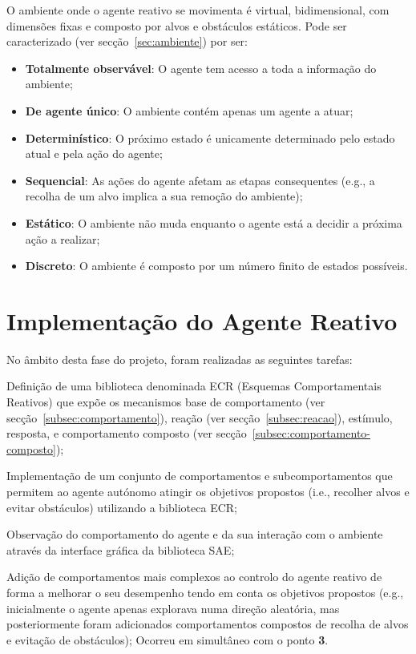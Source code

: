 O ambiente onde o agente reativo se movimenta é virtual, bidimensional, com dimensões fixas e composto por alvos e obstáculos estáticos. Pode ser caracterizado (ver secção~\ref{sec:ambiente}) por ser:

\begin{itemize}
    \item \textbf{Totalmente observável}: O agente tem acesso a toda a informação do ambiente;
    \item \textbf{De agente único}: O ambiente contém apenas um agente a atuar;
    \item \textbf{Determinístico}: O próximo estado é unicamente determinado pelo estado atual e pela ação do agente;
    \item \textbf{Sequencial}: As ações do agente afetam as etapas consequentes (e.g., a recolha de um alvo implica a sua remoção do ambiente);
    \item \textbf{Estático}: O ambiente não muda enquanto o agente está a decidir a próxima ação a realizar;
    \item \textbf{Discreto}: O ambiente é composto por um número finito de estados possíveis.
\end{itemize}


\section{Implementação do Agente Reativo}\label{sec:implementacao-agente-reativo}

No âmbito desta fase do projeto, foram realizadas as seguintes tarefas:

\begin{boldenumerate}
    \item Definição de uma biblioteca denominada ECR (Esquemas Comportamentais Reativos) que expõe os mecanismos base de comportamento (ver secção~\ref{subsec:comportamento}), reação (ver secção~\ref{subsec:reacao}), estímulo, resposta, e comportamento composto (ver secção~\ref{subsec:comportamento-composto});
    \item Implementação de um conjunto de comportamentos e subcomportamentos que permitem ao agente autónomo atingir os objetivos propostos (i.e., recolher alvos e evitar obstáculos) utilizando a biblioteca ECR;
    \item Observação do comportamento do agente e da sua interação com o ambiente através da interface gráfica da biblioteca SAE;
    \item Adição de comportamentos mais complexos ao controlo do agente reativo de forma a melhorar o seu desempenho tendo em conta os objetivos propostos (e.g., inicialmente o agente apenas explorava numa direção aleatória, mas posteriormente foram adicionados comportamentos compostos de recolha de alvos e evitação de obstáculos); Ocorreu em simultâneo com o ponto \textbf{3}.
\end{boldenumerate}

